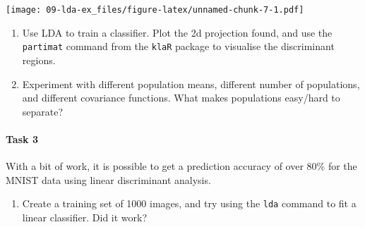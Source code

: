 \documentclass[
]{book}
\newenvironment{Shaded}{\begin{snugshade}}{\end{snugshade}}
\newcommand{\DecValTok}[1]{\textcolor[rgb]{0.00,0.00,0.81}{#1}}
\newcommand{\FunctionTok}[1]{\textcolor[rgb]{0.13,0.29,0.53}{\textbf{#1}}}
\newcommand{\NormalTok}[1]{#1}
\newcommand{\OtherTok}[1]{\textcolor[rgb]{0.56,0.35,0.01}{#1}}
\newcommand{\SpecialCharTok}[1]{\textcolor[rgb]{0.81,0.36,0.00}{\textbf{#1}}}
\newcommand{\StringTok}[1]{\textcolor[rgb]{0.31,0.60,0.02}{#1}}
\providecommand{\tightlist}{%
  \setlength{\itemsep}{0pt}\setlength{\parskip}{0pt}}
\theoremstyle{definition}
\theoremstyle{definition}
\theoremstyle{definition}
\theoremstyle{definition}
\theoremstyle{remark}
\begin{document}
\texttt{[image: 09-lda-ex\_files/figure-latex/unnamed-chunk-7-1.pdf]}

\begin{enumerate}
\def\labelenumi{\roman{enumi}.}
\setcounter{enumi}{1}
\item
  Use LDA to train a classifier. Plot the 2d projection found, and use the \texttt{partimat} command from the \texttt{klaR} package to visualise the discriminant regions.
\item
  Experiment with different population means, different number of populations, and different covariance functions. What makes populations easy/hard to separate?
\end{enumerate}

\hypertarget{task-3-3}{%
\paragraph*{Task 3}\label{task-3-3}}

With a bit of work, it is possible to get a prediction accuracy of over 80\% for the MNIST data using linear discriminant analysis.

\begin{enumerate}
\def\labelenumi{\roman{enumi}.}
\tightlist
\item
  Create a training set of 1000 images, and try using the \texttt{lda} command to fit a linear classifier. Did it work?
\end{enumerate}

\begin{Shaded}
\end{Shaded}
\end{document}
